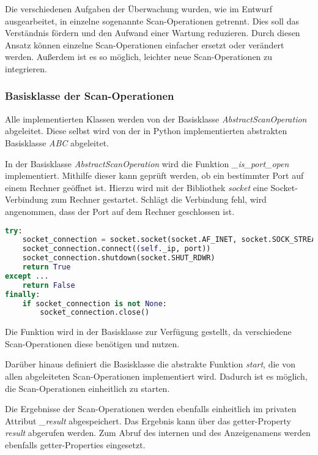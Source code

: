 Die verschiedenen Aufgaben der Überwachung wurden, wie im Entwurf ausgearbeitet, in einzelne sogenannte Scan-Operationen getrennt. Dies soll das Verständnis fördern und den Aufwand einer Wartung reduzieren. Durch diesen Ansatz können einzelne Scan-Operationen einfacher ersetzt oder verändert werden. Außerdem ist es so möglich, leichter neue Scan-Operationen zu integrieren.

\subsubsection{Basisklasse der Scan-Operationen}

Alle implementierten Klassen werden von der Basisklasse \textit{AbstractScanOperation} abgeleitet. Diese selbst wird von der in Python implementierten abstrakten Basisklasse \textit{ABC} abgeleitet.

In der Basisklasse \textit{AbstractScanOperation} wird die Funktion \textit{\_is\_port\_open} implementiert. Mithilfe dieser kann geprüft werden, ob ein bestimmter Port auf einem Rechner geöffnet ist. Hierzu wird mit der Bibliothek \textit{socket} eine Socket-Verbindung zum Rechner gestartet. Schlägt die Verbindung fehl, wird angenommen, dass der Port auf dem Rechner geschlossen ist.

\begin{lstlisting}[language=Python, frame=single, caption={Big Brother Funktion is\_port\_open}, captionpos=b, label={lst:bigbrother-port-open}]
try:
	socket_connection = socket.socket(socket.AF_INET, socket.SOCK_STREAM)
	socket_connection.connect((self._ip, port))
	socket_connection.shutdown(socket.SHUT_RDWR)
	return True
except ...
	return False
finally:
	if socket_connection is not None:
		socket_connection.close()
\end{lstlisting}

Die Funktion wird in der Basisklasse zur Verfügung gestellt, da verschiedene Scan-Operationen diese benötigen und nutzen.

Darüber hinaus definiert die Basisklasse die abstrakte Funktion \textit{start}, die von allen abgeleiteten Scan-Operationen implementiert wird. Dadurch ist es möglich, die Scan-Operationen einheitlich zu starten.

Die Ergebnisse der Scan-Operationen werden ebenfalls einheitlich im privaten Attribut \textit{\_result} abgespeichert. Das Ergebnis kann über das getter-Property \textit{result} abgerufen werden. Zum Abruf des internen und des Anzeigenamens werden ebenfalls getter-Properties eingesetzt. 


